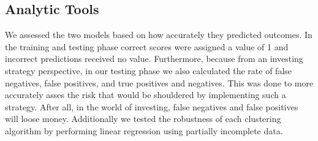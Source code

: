 \documentclass{article}
\begin{document}
\subsection{Analytic Tools}
We assessed the two models based on how accurately they predicted outcomes. In the training and testing phase correct scores were assigned a value of 1 and incorrect predictions received no value. Furthermore, because from an investing strategy perspective, in our testing phase we also calculated the rate of false negatives, false positives, and true positives and negatives. This was done to more accurately asses the risk that would be shouldered by implementing such a strategy. After all, in the world of investing, false negatives and false positives will loose money. Additionally we tested the robustness of each clustering algorithm by performing linear regression using partially incomplete data.
\end{document}
